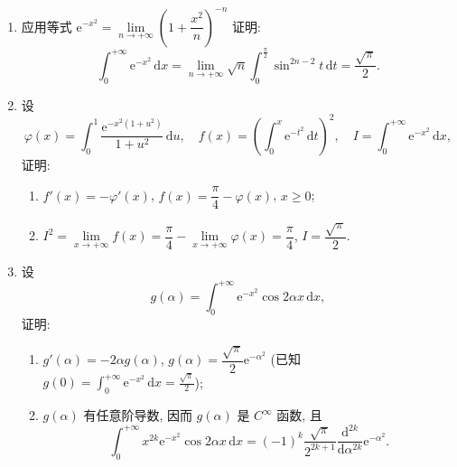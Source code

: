 \begin{exblock}[思考题 15.3]
\begin{enumerate}
\begin{enumerate}
    \[
      I^{2}=\int_{0}^{+\infty}\mathrm{d}\alpha\int_{0}^{+\infty}\alpha\mathrm{e}^{-\alpha^{2}(1+t^{2})}\,\mathrm{d}t=\frac{\pi}{4};
\]
    \item $\displaystyle\int_{0}^{+\infty}\mathrm{e}^{-x^{2}}\,\mathrm{d}x=I=\frac{\sqrt{\pi}}{2}$ (对照, ).
  \end{enumerate}
  \item 应用等式 $\mathrm{e}^{-x^{2}}=\lim\limits_{n\to+\infty}\left(1+\dfrac{x^{2}}{n}\right)^{-n}$ 证明:
  \[
    \int_{0}^{+\infty}\mathrm{e}^{-x^{2}}\,\mathrm{d}x=\lim_{n\to+\infty}\sqrt{n}\int_{0}^{\frac{\pi}{2}}\sin^{2n-2}t\,\mathrm{d}t=\frac{\sqrt{\pi}}{2}.
\]
  \item 设
  \[
    \varphi(x)=\int_{0}^{1}\frac{\mathrm{e}^{-x^{2}(1+u^{2})}}{1+u^{2}}\,\mathrm{d}u,\quad f(x)=\left(\int_{0}^{x}\mathrm{e}^{-t^{2}}\,\mathrm{d}t\right)^{2},\quad I=\int_{0}^{+\infty}\mathrm{e}^{-x^{2}}\,\mathrm{d}x,
\]
  证明:
  \begin{enumerate}
    \item $f'(x)=-\varphi'(x)$, $f(x)=\dfrac{\pi}{4}-\varphi(x)$, $x\geqslant0$;
    \item $I^{2}=\lim\limits_{x\to+\infty}f(x)=\dfrac{\pi}{4}-\lim\limits_{x\to+\infty}\varphi(x)=\dfrac{\pi}{4}$, $I=\dfrac{\sqrt{\pi}}{2}$.
  \end{enumerate}
  \item 设
  \[
    g(\alpha)=\int_{0}^{+\infty}\mathrm{e}^{-x^{2}}\cos2\alpha x\,\mathrm{d}x,
\]
  证明:
  \begin{enumerate}
    \item $g'(\alpha)=-2\alpha g(\alpha)$, $g(\alpha)=\dfrac{\sqrt{\pi}}{2}\mathrm{e}^{-\alpha^{2}}$ (已知 $g(0)=\displaystyle\int_{0}^{+\infty}\mathrm{e}^{-x^{2}}\,\mathrm{d}x=\frac{\sqrt{\pi}}{2}$);
    \item $g(\alpha)$ 有任意阶导数, 因而 $g(\alpha)$ 是 $C^{\infty}$ 函数, 且
    \[
      \int_{0}^{+\infty}x^{2k}\mathrm{e}^{-x^{2}}\cos2\alpha x\,\mathrm{d}x=(-1)^{k}\frac{\sqrt{\pi}}{2^{2k+1}}\frac{\mathrm{d}^{2k}}{\mathrm{d}\alpha^{2k}}\mathrm{e}^{-\alpha^{2}}.
\]
  \end{enumerate}
\end{enumerate}
\end{exblock}
